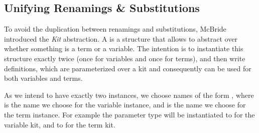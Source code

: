 \documentclass[a4paper, UKenglish, cleveref, autoref, thm-restate]{lipics-v2021}
\newenvironment{LibCode*}{%
  \begin{tcolorbox}[%
    colframe=white,%
    boxrule=0.0pt,%
    top=2.5pt,%
    left=2.5pt,%
    bottom=2.5pt,%
    right=2.5pt,%
    before skip=5pt,%
    after skip=5pt,%
    boxsep=0pt%
  ]
}{%
  \end{tcolorbox}%
}
\newcommand*\LibCode[1]{\begin{LibCode*}{#1}\end{LibCode*}}
\newcommand*\ACode[1]{\AgdaFontStyle{\textcolor{mygray}{#1}}}
\newcommand*\AField[1]{\AgdaField{#1}}
\newcommand*\ACon[1]{\AgdaInductiveConstructor{#1}}
\begin{document}
  \subsection{Unifying Renamings \& Substitutions}
  \label{sec:maps:kits}
  To avoid the duplication between renamings and substitutions,
  McBride\cite{DBLP:journals/jar/BentonHKM12, unpublished:mcbride2005kits}
  introduced the \emph{Kit} abstraction.%
  A \ACode{Kit} is a structure that allows to abstract over whether
  something is a term or a variable. The intention is to instantiate
  this structure exactly twice (once for variables and once for terms),
  and then write definitions, which are parameterized over a kit and
  consequently can be used for both variables and terms.
  \LibCode\KKit

  As we intend to have exactly two \ACode{\ACon{Kit}} instances, we choose names of
  the form \ACode{x/y}, where \ACode{x} is the name we choose for the
  variable instance, and \ACode{y} is the name we choose for the term
  instance.
  For example the parameter type \ACode{\_∋/⊢\_} will be instantiated
  to \ACode{\ACon{\_∋\_}} for the variable kit, and to \ACode{\AField{\_⊢\_}} for the
  term kit.
\end{document}
